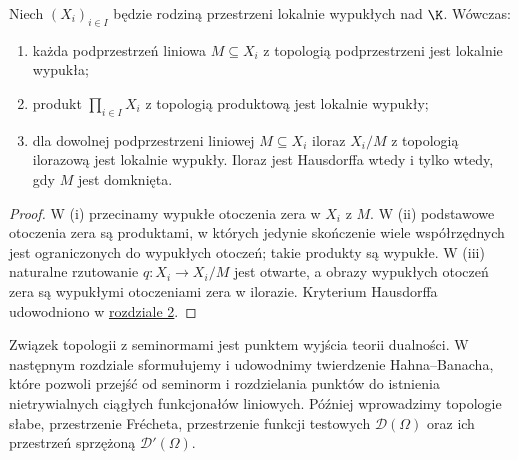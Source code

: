 \begin{stwierdzenie}
\label{prop:lcs-constructions}
Niech $(X_i)_{i\in I}$ będzie rodziną przestrzeni lokalnie
wypukłych nad $\K$. Wówczas:
\begin{enumerate}[label=\textup{(\roman*)}]
\item każda podprzestrzeń liniowa $M\subseteq X_i$ z topologią
podprzestrzeni jest lokalnie wypukła;
\item produkt $\prod_{i\in I}X_i$ z topologią produktową
jest lokalnie wypukły;
\item dla dowolnej podprzestrzeni liniowej $M\subseteq X_i$
iloraz $X_i/M$ z topologią ilorazową jest lokalnie wypukły.
Iloraz jest Hausdorffa wtedy i tylko wtedy, gdy $M$ jest domknięta.
\end{enumerate}
\end{stwierdzenie}
\begin{proof}
W (i) przecinamy wypukłe otoczenia zera w $X_i$
z $M$. W (ii) podstawowe otoczenia zera są produktami,
w których jedynie skończenie wiele współrzędnych
jest ograniczonych do wypukłych otoczeń; takie produkty
są wypukłe. W (iii) naturalne rzutowanie
$q:X_i\to X_i/M$ jest otwarte, a obrazy wypukłych
otoczeń zera są wypukłymi otoczeniami zera w ilorazie.
Kryterium Hausdorffa udowodniono w
\hyperref[sec:konstrukcje]{rozdziale 2}.
\end{proof}

\begin{uwaga}
Związek topologii z seminormami jest punktem wyjścia
teorii dualności. W następnym rozdziale sformułujemy i
udowodnimy twierdzenie Hahna--Banacha, które pozwoli
przejść od seminorm i rozdzielania punktów do istnienia
nietrywialnych ciągłych funkcjonałów liniowych.
Później wprowadzimy topologie słabe, przestrzenie Frécheta,
przestrzenie funkcji testowych $\mathcal D(\Omega)$ oraz ich
przestrzeń sprzężoną $\mathcal D'(\Omega)$.
\end{uwaga}
